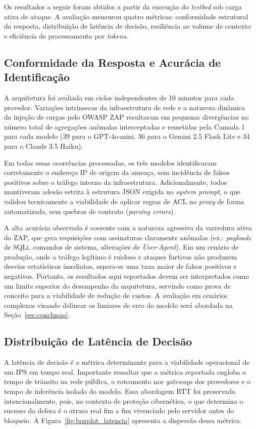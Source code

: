 \documentclass[sigconf, anonymous]{acmart}
\begin{document}
Os resultados a seguir foram obtidos a partir da execução do \textit{testbed} sob carga ativa de ataque. A avaliação mensurou quatro métricas: conformidade estrutural da resposta, distribuição de latência de decisão, resiliência ao volume de contexto e eficiência de processamento por \textit{tokens}.

\subsection{Conformidade da Resposta e Acurácia de Identificação}

A arquitetura foi avaliada em ciclos independentes de 10 minutos para cada provedor. Variações intrínsecas da infraestrutura de rede e a natureza dinâmica da injeção de cargas pelo OWASP ZAP resultaram em pequenas divergências no número total de agregações anômalas interceptadas e remetidas pela Camada 1 para cada modelo (39 para o GPT-4o-mini, 36 para o Gemini 2.5 Flash Lite e 34 para o Claude 3.5 Haiku). 

Em todas essas ocorrências processadas, os três modelos identificaram corretamente o endereço IP de origem da ameaça, sem incidência de falsos positivos sobre o tráfego interno da infraestrutura. Adicionalmente, todos mantiveram adesão estrita à estrutura \ac{JSON} exigida no \textit{system prompt}, o que validou tecnicamente a viabilidade de aplicar regras de \ac{ACL} no \textit{proxy} de forma automatizada, sem quebras de contrato (\textit{parsing errors}).

A alta acurácia observada é coerente com a natureza agressiva da varredura ativa do ZAP, que gera requisições com assinaturas claramente anômalas (ex.: \textit{payloads} de SQLi, comandos de sistema, alterações de \textit{User-Agent}). Em um cenário de produção, onde o tráfego legítimo é ruidoso e ataques furtivos não produzem desvios estatísticos imediatos, espera-se uma taxa maior de falsos positivos e negativos. Portanto, os resultados aqui reportados devem ser interpretados como um limite superior do desempenho da arquitetura, servindo como prova de conceito para a viabilidade de redução de custos. A avaliação em cenários complexos visando delinear os limiares de erro do modelo será abordada na Seção~\ref{sec:conclusao}.

\subsection{Distribuição de Latência de Decisão}

A latência de decisão é a métrica determinante para a viabilidade operacional de um \ac{IPS} em tempo real. Importante ressaltar que a métrica reportada engloba o tempo de trânsito na rede pública, o roteamento nos \textit{gateways} dos provedores e o tempo de inferência isolado do modelo. Essa abordagem RTT foi preservada intencionalmente, pois, no contexto de proteção cibernética, o que determina o sucesso da defesa é o atraso real fim a fim vivenciado pelo servidor antes do bloqueio. A Figura~\ref{fig:boxplot_latencia} apresenta a dispersão dessa métrica.
\end{document}

